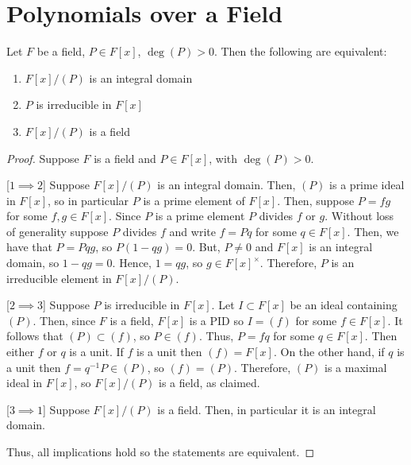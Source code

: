 \documentclass[12pt, a4paper, oneside, openright, titlepage]{book}
\begin{document}
\section{\textsection Polynomials over a Field}

\begin{thm}
    Let $F$ be a field, $P \in F[x]$, $\deg(P) > 0$. Then the following are equivalent:\begin{enumerate}
        \item $F[x]/(P)$ is an integral domain
        \item $P$ is irreducible in $F[x]$
        \item $F[x]/(P)$ is a field
    \end{enumerate}
\end{thm}
\begin{proof}
    Suppose $F$ is a field and $P \in F[x]$, with $\deg(P) > 0$.
    
    [$1 \implies 2$] Suppose $F[x]/(P)$ is an integral domain. Then, $(P)$ is a prime ideal in $F[x]$, so in particular $P$ is a prime element of $F[x]$. Then, suppose $P = fg$ for some $f,g \in F[x]$. Since $P$ is a prime element $P$ divides $f$ or $g$. Without loss of generality suppose $P$ divides $f$ and write $f = Pq$ for some $q \in F[x]$. Then, we have that $P = Pqg$, so $P(1-qg) = 0$. But, $P \neq 0$ and $F[x]$ is an integral domain, so $1-qg = 0$. Hence, $1 = qg$, so $g \in F[x]^{\times}$. Therefore, $P$ is an irreducible element in $F[x]/(P)$.
    
    
    [$2 \implies 3$] Suppose $P$ is irreducible in $F[x]$. Let $I \subset F[x]$ be an ideal containing $(P)$. Then, since $F$ is a field, $F[x]$ is a PID so $I = (f)$ for some $f \in F[x]$. It follows that $(P) \subset (f)$, so $P \in (f)$. Thus, $P = fq$ for some $q \in F[x]$. Then either $f$ or $q$ is a unit. If $f$ is a unit then $(f) = F[x]$. On the other hand, if $q$ is a unit then $f = q^{-1}P \in (P)$, so $(f) = (P)$. Therefore, $(P)$ is a maximal ideal in $F[x]$, so $F[x]/(P)$ is a field, as claimed.
    
    
    [$3 \implies 1$] Suppose $F[x]/(P)$ is a field. Then, in particular it is an integral domain.
    
    Thus, all implications hold so the statements are equivalent.
\end{proof}
\end{document}
